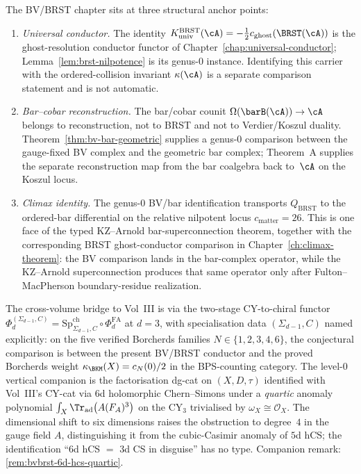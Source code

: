 \begin{remark}
\label{rem:bv-brst-anchors}
The BV/BRST chapter sits at three structural anchor
points:
\begin{enumerate}[label=\textup{(W\arabic*)}]
\item \emph{Universal conductor.} The identity
 $K_{\mathrm{univ}}^{\mathrm{BRST}}(\cA)
 =-\tfrac12c_{\mathrm{ghost}}(\BRST(\cA))$ is the ghost-resolution
 conductor functor of Chapter~\ref{chap:universal-conductor};
 Lemma~\ref{lem:brst-nilpotence} is its genus-$0$ instance. Identifying
 this carrier with the ordered-collision invariant $\kappa(\cA)$ is a
 separate comparison statement and is not automatic.
\item \emph{Bar--cobar reconstruction.} The bar/cobar counit
 $\Omega(\barB(\cA)) \to \cA$ belongs to reconstruction, not to
 BRST and not to Verdier/Koszul duality. Theorem~\ref{thm:bv-bar-geometric}
 supplies a genus-$0$ comparison between the gauge-fixed BV complex
 and the geometric bar complex; Theorem~A supplies the separate
 reconstruction map from the bar coalgebra back to~$\cA$ on the
 Koszul locus.
\item \emph{Climax identity.} The genus-$0$ BV/bar identification
transports $Q_{\mathrm{BRST}}$ to the ordered-bar differential on the
relative nilpotent locus $c_{\mathrm{matter}}=26$. This is one
face of the typed KZ--Arnold bar-superconnection theorem, together
with the corresponding BRST ghost-conductor comparison in
Chapter~\ref{ch:climax-theorem}: the BV comparison lands in the
bar-complex operator, while the KZ--Arnold superconnection produces
that same operator only after Fulton--MacPherson boundary-residue
realization.
\end{enumerate}
The cross-volume bridge to Vol~III is via the two-stage
CY-to-chiral functor
$\Phi_d^{(\Sigma_{d-1}, C)}
=\mathrm{Sp}^{\mathrm{ch}}_{\Sigma_{d-1},C}\circ\Phi_d^{\mathrm{FA}}$
at $d=3$, with specialisation data $(\Sigma_{d-1}, C)$ named
explicitly: on the five verified Borcherds families
$N \in \{1,2,3,4,6\}$, the conjectural comparison is between the
present BV/BRST conductor and the proved Borcherds weight
$\kappa_{\BKM}(X)=c_N(0)/2$ in the BPS-counting category. The
level-$0$ vertical companion is the factorisation dg-cat on
$(X, D, \tau)$ identified with Vol~III's CY-cat via 6d holomorphic
Chern--Simons under a \emph{quartic} anomaly polynomial
$\int_X\Tr_{\mathrm{ad}}\bigl(A(F_A)^3\bigr)$ on the CY$_3$ trivialised
by $\omega_X\cong\mathcal{O}_X$. The dimensional shift to
six dimensions raises the obstruction to degree~$4$ in the gauge field
$A$, distinguishing it from the cubic-Casimir anomaly of $5$d hCS; the
identification ``$6$d hCS $=$ $3$d CS in disguise'' has no type.
Companion remark: \ref{rem:bvbrst-6d-hcs-quartic}.
\end{remark}

